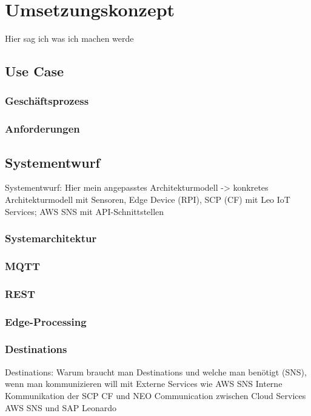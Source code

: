 \section{Umsetzungskonzept}
Hier sag ich was ich machen werde

\subsection{Use Case}

\subsubsection{Geschäftsprozess}

\subsubsection{Anforderungen}


\subsection{Systementwurf}
Systementwurf: Hier mein angepasstes Architekturmodell -> konkretes Architekturmodell mit Sensoren, Edge Device (RPI), SCP (CF) mit Leo IoT Services; AWS SNS mit API-Schnittstellen

\subsubsection{Systemarchitektur}

\subsubsection{MQTT}

\subsubsection{REST}

\subsubsection{Edge-Processing}

\subsubsection{Destinations}
Destinations: Warum braucht man Destinations und welche man benötigt (SNS),  wenn man kommunizieren will mit
Externe Services wie AWS SNS
Interne Kommunikation der SCP CF und NEO
Communication zwischen Cloud Services AWS SNS und SAP Leonardo

